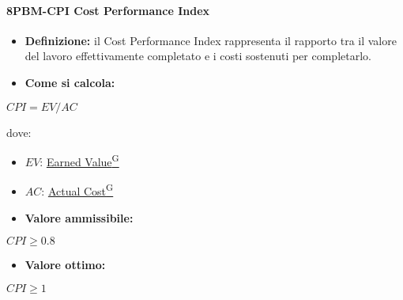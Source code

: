 \paragraph*{8PBM-CPI Cost Performance Index}
\begin{itemize}
    \item \textbf{Definizione:} il Cost Performance Index rappresenta il rapporto tra il valore del lavoro effettivamente completato e i costi sostenuti per completarlo.
    \item \textbf{Come si calcola:}
\end{itemize}
\begin{center}
   $CPI = EV/AC$ 
\end{center}
dove:
\begin{itemize}[label=$\rightarrow$]
    \item $EV$: \href{https://code7crusaders.github.io/docs/PB/documentazione_interna/glossario.html#earned-value}{Earned Value\textsuperscript{G}}
    \item $AC$: \href{https://code7crusaders.github.io/docs/PB/documentazione_interna/glossario.html#actual-cost}{Actual Cost\textsuperscript{G}}
\end{itemize}
\begin{itemize}
    \item \textbf{Valore ammissibile:}
\end{itemize}
\begin{center}
    $CPI \geq 0.8$
\end{center}
\begin{itemize}
    \item \textbf{Valore ottimo:}
\end{itemize}
\begin{center}
    $CPI \geq 1$
\end{center}

